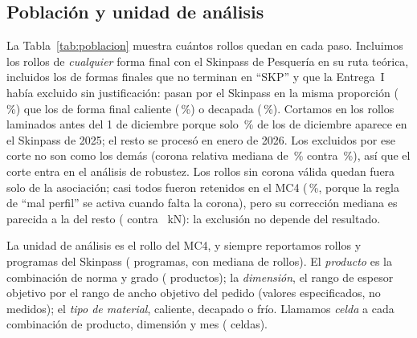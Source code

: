 \subsection{Población y unidad de análisis}
\label{sec:poblacion}

\begin{table}[t]
\centering
\caption{Población de estudio paso a paso. Cada paso conserva los rollos que cumplen su criterio y los anteriores.
Progr.~SKP: programas del Skinpass distintos.}
\label{tab:poblacion}
\footnotesize

\end{table}

La Tabla~\ref{tab:poblacion} muestra cuántos rollos quedan en cada paso. Incluimos los rollos de \emph{cualquier}
forma final con el Skinpass de Pesquería en su ruta teórica, incluidos los \NOtras{} de formas finales que no terminan
en ``SKP'' y que la Entrega~I había excluido sin justificación: pasan por el Skinpass en la misma proporción
(\PctOtrasEnSKP\,\%) que los de forma final caliente (\PctCalienteEnSKP\,\%) o decapada (\PctDecapadoEnSKP\,\%).
Cortamos en los rollos laminados antes del 1 de diciembre porque solo \PctDicEnSKP\,\% de los de diciembre aparece en
el Skinpass de 2025; el resto se procesó en enero de 2026. Los excluidos por ese corte no son como los demás (corona
relativa mediana de \CoronaRelMedianaDic\,\% contra \CoronaRelMediana\,\%), así que el corte entra en el análisis de
robustez. Los \NExclSinCorona{} rollos sin corona válida quedan fuera solo de la asociación; casi todos fueron
retenidos en el MC4 (\PctRetenidoSinCorona\,\%, porque la regla de ``mal perfil'' se activa cuando falta la corona),
pero su corrección mediana es parecida a la del resto (\YMedianaSinCorona{} contra \YMediana~kN): la exclusión no depende
del resultado.

La unidad de análisis es el rollo del MC4, y siempre reportamos rollos y programas del Skinpass (\NProgramas{}
programas, con mediana de \MedianaRollosPrograma{} rollos). El \emph{producto} es la combinación de norma y grado
(\NProductos{} productos); la \emph{dimensión}, el rango de espesor objetivo por el rango de ancho objetivo del pedido
(valores especificados, no medidos); el \emph{tipo de material}, caliente, decapado o frío. Llamamos \emph{celda} a
cada combinación de producto, dimensión y mes (\NCeldas{} celdas).

